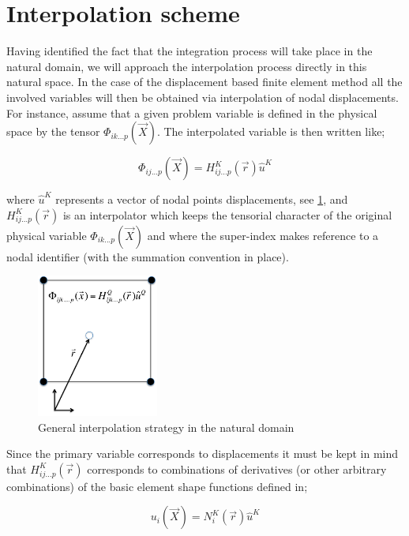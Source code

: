 	 								
\section*{Interpolation scheme}
Having identified the fact that the integration process will take place in the natural domain, we will approach the interpolation process directly in this natural space. In the case of the displacement based finite element method all the involved variables will then be obtained via interpolation of nodal displacements. For instance, assume that a given problem variable is defined in the physical space by the tensor $\Phi_{ik...p}(\vec{X})$. The interpolated variable is then written like;

\begin{equation}
\Phi_{ij...p}(\vec{X})=H_{ij...p}^K(\vec{r})\hat{u}^K
\label{eq:interpol}
\end{equation}	 						

where $\hat{u}^K$ represents a vector of nodal points displacements, see \cref{fig:interpol nat dom}, and $H_{ij...p}^K(\vec{r})$ is an interpolator which keeps the tensorial character of the original physical variable $\Phi_{ik...p}(\vec{X})$ and where the super-index makes reference to a nodal identifier (with the summation convention in place).


\begin{figure}[h]
\centering
\includegraphics[width=4cm]{img/figure2.pdf}
\caption{General interpolation strategy in the natural domain}
\label{fig:interpol nat dom}
\end{figure}
 


Since the primary variable corresponds to displacements it must be kept in mind that $H_{ij...p}^K(\vec{r})$ corresponds to combinations of derivatives (or other arbitrary combinations) of the basic element shape functions defined in;


\begin{equation}
u_i(\vec{X})=N_i^K(\vec{r})\hat{u}^K
\label{eq:el interpol}
\end{equation}



